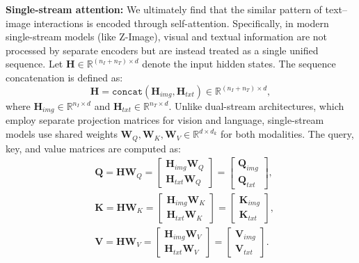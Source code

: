 \textbf{Single-stream attention:}
We ultimately find that the similar pattern of text–image interactions is encoded through self-attention. Specifically, in modern single-stream models (like Z-Image), visual and textual information are not processed by separate encoders but are instead treated as a single unified sequence. Let $\mathbf{H} \in \mathbb{R}^{(n_I + n_T) \times d}$ denote the input hidden states. The sequence concatenation is defined as:
\begin{equation}
    \mathbf{H} = \mathtt{concat}(\mathbf{H}_{img}, \mathbf{H}_{txt}) \in \mathbb{R}^{(n_I + n_T) \times d},
\end{equation}
where $\mathbf{H}_{img} \in \mathbb{R}^{n_I \times d}$ and $\mathbf{H}_{txt} \in \mathbb{R}^{n_T \times d}$. Unlike dual-stream architectures, which employ separate projection matrices for vision and language,  single-stream models use shared weights $\mathbf{W}_Q, \mathbf{W}_K, \mathbf{W}_V \in \mathbb{R}^{d \times d_k}$ for both modalities. The query, key, and value matrices are computed as:
\begin{equation}
\begin{aligned}
    &\mathbf{Q} = \mathbf{H} \mathbf{W}_Q = \begin{bmatrix} \mathbf{H}_{img}\mathbf{W}_Q \\ \mathbf{H}_{txt}\mathbf{W}_Q \end{bmatrix} = \begin{bmatrix} \mathbf{Q}_{img} \\ \mathbf{Q}_{txt} \end{bmatrix}, \\
    &\mathbf{K} = \mathbf{H} \mathbf{W}_K = \begin{bmatrix} \mathbf{H}_{img}\mathbf{W}_K \\ \mathbf{H}_{txt}\mathbf{W}_K \end{bmatrix} = \begin{bmatrix} \mathbf{K}_{img} \\ \mathbf{K}_{txt} \end{bmatrix}, \\
    &\mathbf{V} = \mathbf{H} \mathbf{W}_V = \begin{bmatrix} \mathbf{H}_{img}\mathbf{W}_V \\ \mathbf{H}_{txt}\mathbf{W}_V \end{bmatrix} = \begin{bmatrix} \mathbf{V}_{img} \\ \mathbf{V}_{txt} \end{bmatrix}.
\end{aligned}
\end{equation}
